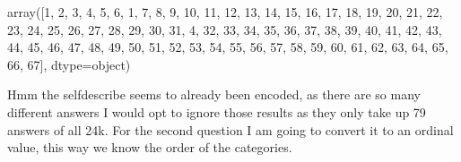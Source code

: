 \documentclass[letterpaper,10pt,english]{jupyterBook}
\begin{document}
\begin{sphinxVerbatim}[commandchars=\\\{\}]
array([\PYGZsq{}\PYGZhy{}1\PYGZsq{}, \PYGZsq{}2\PYGZsq{}, \PYGZsq{}3\PYGZsq{}, \PYGZsq{}4\PYGZsq{}, \PYGZsq{}5\PYGZsq{}, \PYGZsq{}6\PYGZsq{}, \PYGZhy{}1, 7, 8, 9, 10, 11, 12, 13, 14, 15,
       16, 17, 18, 19, 20, 21, 22, 23, 24, 25, 26, 27, 28, 29, 30, 31, 4,
       32, 33, 34, 35, 36, 37, 38, 39, 40, 41, 42, 43, 44, 45, 46, 47, 48,
       49, 50, 51, 52, 53, 54, 55, 56, 57, 58, 59, 60, 61, 62, 63, 64, 65,
       66, 67], dtype=object)
\end{sphinxVerbatim}

\sphinxAtStartPar
Hmm the self\sphinxhyphen{}describe seems to already been encoded, as there are so many different answers I would opt to ignore those results as they only take up 79 answers of all 24k.
For the second question I am going to convert it to an ordinal value, this way we know the order of the categories.

\begin{sphinxVerbatim}[commandchars=\\\{\}]
  \PYG{p}{[}           \PYG{p}{]} 
\end{sphinxVerbatim}
\end{document}
